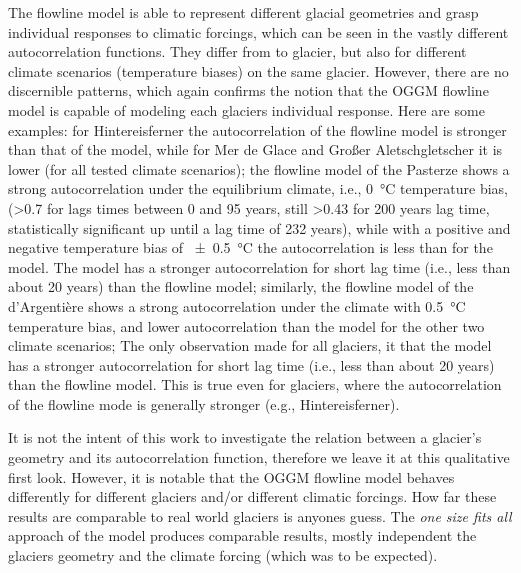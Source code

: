       The flowline model is able to represent different glacial geometries and grasp individual responses to climatic forcings, which can be seen in the vastly different autocorrelation functions. They differ from to glacier, but also for different climate scenarios (temperature biases) on the same glacier. However, there are no discernible patterns, which again confirms the notion that the OGGM flowline model is capable of modeling each glaciers individual response. Here are some examples: for Hintereisferner the autocorrelation of the flowline model is stronger than that of the \vas{} model, while for Mer de Glace and Großer Aletschgletscher it is lower (for all tested climate scenarios); the flowline model of the Pasterze shows a strong autocorrelation under the equilibrium climate, i.e., \SI{0}{\celsius} temperature bias, (>0.7 for lags times between 0 and 95 years, still >0.43 for 200 years lag time, statistically significant up until a lag time of 232 years), while with a positive and negative temperature bias of \SI{\pm0.5}{\celsius} the autocorrelation is less than for the \vas{} model.
      The \vas{} model has a stronger autocorrelation for short lag time (i.e., less than about 20 years) than the flowline model; similarly, the flowline model of the d'Argentière shows a strong autocorrelation under the climate with \SI{+0.5}{\celsius} temperature bias, and lower autocorrelation than the \vas{} model for the other two climate scenarios; The only observation made for all glaciers, it that the \vas{} model has a stronger autocorrelation for short lag time (i.e., less than about 20 years) than the flowline model. This is true even for glaciers, where the autocorrelation of the flowline mode is generally stronger (e.g., Hintereisferner). 

      It is not the intent of this work to investigate the relation between a glacier's geometry and its autocorrelation function, therefore we leave it at this qualitative first look. However, it is notable that the OGGM flowline model behaves differently for different glaciers and/or different climatic forcings. How far these results are comparable to real world glaciers is anyones guess. The \textit{one size fits all} approach of the \vas{} model produces comparable results, mostly independent the glaciers geometry and the climate forcing (which was to be expected).

